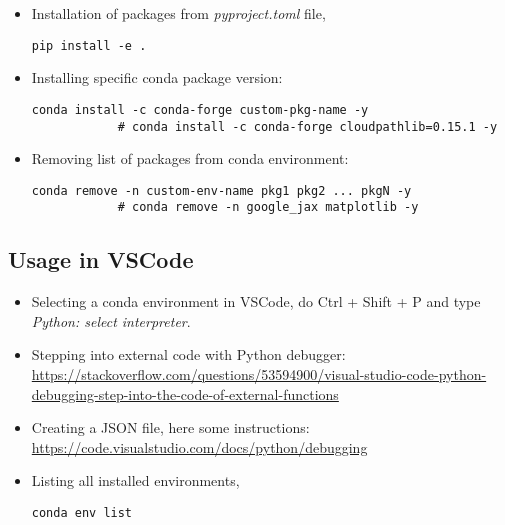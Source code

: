 \documentclass[12pt, a4paper]{article}
\numberwithin{equation}{section}
\theoremstyle{definition}
\theoremstyle{definition}
\begin{document}
	\begin{itemize} 
	
		\item Installation of packages from \textit{pyproject.toml} file, 
		
		\begin{lstlisting}[style=mystylebash, label=alg:pyproject_install, xleftmargin=\parindent]
			pip install -e . 
		\end{lstlisting}
	
		\item Installing specific conda package version:
		
		\begin{lstlisting}[style=mystylebash, label=alg:conda__spec_env_version, xleftmargin=\parindent]
			conda install -c conda-forge custom-pkg-name -y
			# conda install -c conda-forge cloudpathlib=0.15.1 -y
		\end{lstlisting}
	
		\item Removing list of packages from conda environment: 
		
		\begin{lstlisting}[style=mystylebash, label=alg:conda__remove_pkgs, xleftmargin=\parindent]
			conda remove -n custom-env-name pkg1 pkg2 ... pkgN -y
			# conda remove -n google_jax matplotlib -y
		\end{lstlisting}
		
	\end{itemize}

	\subsection{Usage in VSCode}

	\begin{itemize}
		\item Selecting a conda environment in VSCode, do Ctrl + Shift + P and type \textit{Python: select interpreter}. 
		
		\item Stepping into external code with Python debugger:  \url{https://stackoverflow.com/questions/53594900/visual-studio-code-python-debugging-step-into-the-code-of-external-functions}
		
		
		\item Creating a JSON file, here some instructions: \url{https://code.visualstudio.com/docs/python/debugging}
		
		\item Listing all installed environments, 
		
		\begin{lstlisting}[style=mystylebash, label=alg:conda_env_list, xleftmargin=\parindent]
			conda env list
		\end{lstlisting}
		
	\end{itemize}
\end{document}
